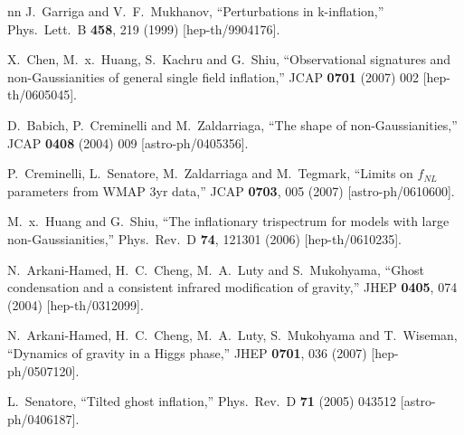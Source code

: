 \documentclass[12pt,letterpaper]{article}
\begin{document}
{\begin{thebibliography}{nn}
  J.~Garriga and V.~F.~Mukhanov,
  ``Perturbations in k-inflation,''
  Phys.\ Lett.\  B {\bf 458}, 219 (1999)
  [hep-th/9904176].

  X.~Chen, M.~x.~Huang, S.~Kachru and G.~Shiu,
  ``Observational signatures and non-Gaussianities of general single field
  inflation,''
  JCAP {\bf 0701} (2007) 002
  [hep-th/0605045].

  D.~Babich, P.~Creminelli and M.~Zaldarriaga,
  ``The shape of non-Gaussianities,''
  JCAP {\bf 0408} (2004) 009
  [astro-ph/0405356].

  P.~Creminelli, L.~Senatore, M.~Zaldarriaga and M.~Tegmark,
  ``Limits on $f_{NL}$ parameters from WMAP 3yr data,''
  JCAP {\bf 0703}, 005 (2007)
  [astro-ph/0610600].

  M.~x.~Huang and G.~Shiu,
  ``The inflationary trispectrum for models with large non-Gaussianities,''
  Phys.\ Rev.\  D {\bf 74}, 121301 (2006)
  [hep-th/0610235].

  N.~Arkani-Hamed, H.~C.~Cheng, M.~A.~Luty and S.~Mukohyama,
  ``Ghost condensation and a consistent infrared modification of gravity,''
  JHEP {\bf 0405}, 074 (2004)
  [hep-th/0312099].

  N.~Arkani-Hamed, H.~C.~Cheng, M.~A.~Luty, S.~Mukohyama and T.~Wiseman,
  ``Dynamics of gravity in a Higgs phase,''
  JHEP {\bf 0701}, 036 (2007)
  [hep-ph/0507120].

  L.~Senatore,
  ``Tilted ghost inflation,''
  Phys.\ Rev.\ D {\bf 71} (2005) 043512
  [astro-ph/0406187].



\end{thebibliography}}
\end{document}
